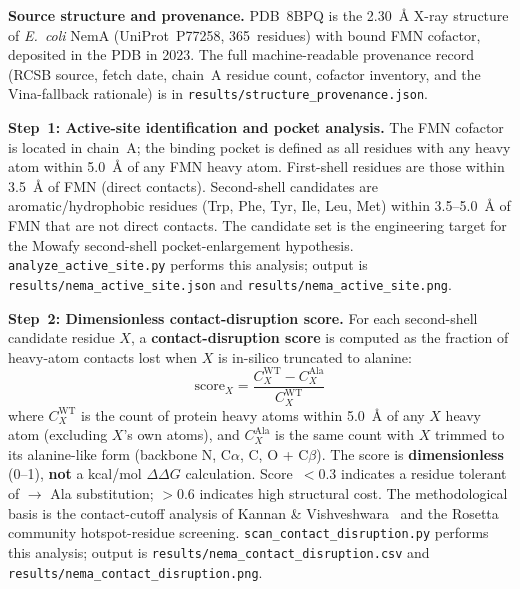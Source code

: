 \documentclass[10pt,twocolumn,letterpaper,
              colorlinks=true,
              linkcolor=blue!70!black,
              citecolor=blue!70!black,
              urlcolor=blue!70!black,
              pdfborder={0 0 0}]{article}
\begin{document}
\medskip
\textbf{Source structure and provenance.} PDB~8BPQ is the 2.30~\AA{}
X-ray structure of \textit{E.~coli} NemA (UniProt~P77258, 365~residues)
with bound FMN cofactor, deposited in the PDB in 2023. The full
machine-readable provenance record (RCSB source, fetch date, chain~A
residue count, cofactor inventory, and the Vina-fallback rationale) is
in \texttt{results/structure\_provenance.json}.

\medskip
\textbf{Step~1: Active-site identification and pocket analysis.}
The FMN cofactor is located in chain~A; the binding pocket is defined as
all residues with any heavy atom within 5.0~\AA{} of any FMN heavy
atom. First-shell residues are those within 3.5~\AA{} of FMN (direct
contacts). Second-shell candidates are aromatic/hydrophobic residues
(Trp, Phe, Tyr, Ile, Leu, Met) within 3.5--5.0~\AA{} of FMN that are
not direct contacts. The candidate set is the engineering target for the
Mowafy second-shell pocket-enlargement hypothesis.
\texttt{analyze\_active\_site.py} performs this analysis; output is
\texttt{results/nema\_active\_site.json} and
\texttt{results/nema\_active\_site.png}.

\medskip
\textbf{Step~2: Dimensionless contact-disruption score.}
For each second-shell candidate residue $X$, a
\textbf{contact-disruption score} is computed as the fraction of
heavy-atom contacts lost when $X$ is in-silico truncated to alanine:
\begin{equation}
  \mathrm{score}_X
  = \frac{C_X^{\mathrm{WT}} - C_X^{\mathrm{Ala}}}{C_X^{\mathrm{WT}}}
\end{equation}
where $C_X^{\mathrm{WT}}$ is the count of protein heavy atoms within
5.0~\AA{} of any $X$ heavy atom (excluding $X$'s own atoms), and
$C_X^{\mathrm{Ala}}$ is the same count with $X$ trimmed to its
alanine-like form (backbone N, C$\alpha$, C, O + C$\beta$). The score
is \textbf{dimensionless} (0--1), \textbf{not} a kcal/mol
$\Delta\Delta G$ calculation. Score~$< 0.3$ indicates a residue tolerant
of $\rightarrow$ Ala substitution; ${>} 0.6$ indicates high structural
cost. The methodological basis is the contact-cutoff analysis of Kannan
\& Vishveshwara~\cite{kannan1999} and the Rosetta community
hotspot-residue screening. \texttt{scan\_contact\_disruption.py}
performs this analysis; output is
\texttt{results/nema\_contact\_disruption.csv} and
\texttt{results/nema\_contact\_disruption.png}.
\end{document}
